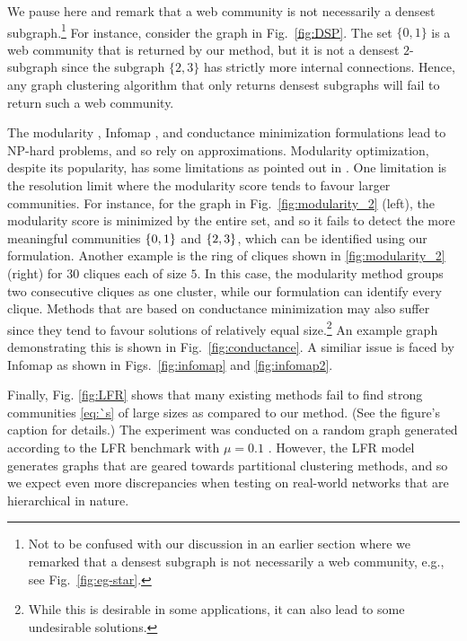 We pause here and remark that a web community is not necessarily a densest subgraph.\footnote{Not to be confused
	with our discussion in an earlier section where we remarked that a densest subgraph is not necessarily a web community, e.g., see
	Fig.~\ref{fig:eg-star}.} 
For instance, consider the graph in Fig.~\ref{fig:DSP}.  The set $\{0,1\}$ is a web community
that is returned by our method, but it is not a densest $2$-subgraph since the subgraph $\{2,3\}$
has strictly more internal connections.  Hence, any graph clustering algorithm that only returns densest
subgraphs will fail to return such a web community.


The modularity \cite{newman2006modularity}, Infomap \cite{rosvall2009map}, and conductance
minimization \cite{shi2000normalized} formulations lead to NP-hard problems, and so rely on
approximations.
Modularity optimization, despite its popularity, has some limitations as pointed out in
\cite{fortunato2007resolution}. One limitation is the resolution limit where the modularity score tends to favour larger
communities. 
For instance, for the graph in Fig.~\ref{fig:modularity_2} (left), the  modularity score is
minimized by the entire set, and so it fails to detect the more meaningful communities $\{0,1\}$
and $\{2,3\}$, which can be identified using our formulation.
Another example is  the ring of cliques \cite{fortunato2007resolution} shown in \ref{fig:modularity_2} (right) for 
$30$ cliques each of size $5$. In this case, the modularity method
groups two consecutive cliques as one cluster, while our formulation can identify every clique.
%
Methods that are based on conductance minimization may also suffer since they tend to favour solutions of
relatively equal size.\footnote{While this is desirable in some applications, it can also lead to some
undesirable solutions.} An example graph demonstrating this is shown in Fig.~\ref{fig:conductance}.
A similiar issue is faced by Infomap as shown in Figs.~\ref{fig:infomap} and \ref{fig:infomap2}.


Finally, Fig. \ref{fig:LFR} shows that many existing methods fail to find strong communities
\eqref{eq:`s} of large sizes as compared to our method. (See the figure's caption for details.)
The experiment was conducted on a random graph generated according to the LFR benchmark with $\mu = 0.1$
\cite{lancichinetti2009benchmarks}.
However, the LFR model generates graphs that are geared towards partitional clustering methods,
and so we expect even more discrepancies when testing on real-world networks that are hierarchical
in nature.






